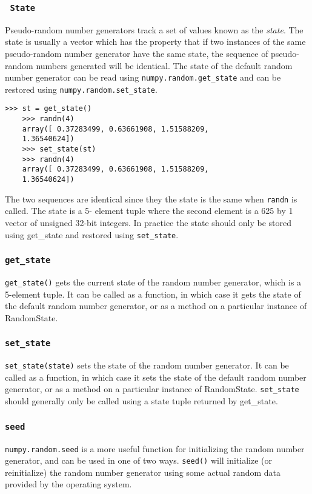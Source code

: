 \documentclass[KSmain.tex]{subfiles}
\begin{document}
\subsubsection{\texttt{ State}}
Pseudo-random number generators track a set of values known as the \textit{state}. The state is usually a vector
which has the property that if two instances of the same pseudo-random number generator have the
same state, the sequence of pseudo-random numbers generated will be identical. The state of the default
random number generator can be read using \texttt{numpy.random.get\_state} and can be restored using
\texttt{numpy.random.set\_state}.
\begin{framed}
	\begin{verbatim}>>> st = get_state()
	>>> randn(4)
	array([ 0.37283499, 0.63661908, 1.51588209,
	1.36540624])
	>>> set_state(st)
	>>> randn(4)
	array([ 0.37283499, 0.63661908, 1.51588209,
	1.36540624])
	\end{verbatim}
\end{framed}
The two sequences are identical since they the state is the same when \texttt{randn} is called. The state is a 5-
element tuple where the second element is a 625 by 1 vector of unsigned 32-bit integers. In practice the
state should only be stored using get\_state and restored using \texttt{set\_state}.
\newpage

\subsubsection{\texttt{get\_state}}
\texttt{get\_state()} gets the current state of the random number generator, which is a 5-element tuple. It can be
called as a function, in which case it gets the state of the default random number generator, or as a method
on a particular instance of RandomState.
\subsubsection*{\texttt{set\_state}}
\texttt{set\_state(state)} sets the state of the random number generator. It can be called as a function, in which
case it sets the state of the default random number generator, or as a method on a particular instance of
RandomState. \texttt{set\_state} should generally only be called using a state tuple returned by get\_state.

\subsubsection*{\texttt{seed}}
\texttt{numpy.random.seed} is a more useful function for initializing the random number generator, and can be
used in one of two ways. \texttt{seed()} will initialize (or reinitialize) the random number generator using some
actual random data provided by the operating system.
\end{document}
